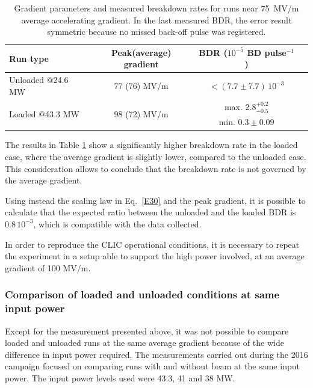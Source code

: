 \begin{table}[h]
  \centering
    \begin{tabular}{ l c c c }
    \hline
    \hline
    Run type							&		Peak(average) gradient  			& BDR ($10^{-5}$ BD pulse$^{-1}$)	\\
    \hline
    Unloaded	@24.6 MW 				&		77 (76) MV/m				&	$< (7.7 \pm 7.7) \, 10^{-3} $ 			\\
    \multirow{ 2}{*}{Loaded  @43.3 MW} 		&		\multirow{ 2}{*}{98 (72) MV/m} 	& 	max. $2.8^{+0.2} _{-0.5}$    		\\
    									&									&	min. $0.3\pm0.09$	\\
    \hline
    \hline
    \end{tabular}
\caption{Gradient parameters and measured breakdown rates for runs near 75~MV/m average accelerating gradient. In the last measured BDR, the error result symmetric because no missed back-off pulse was registered. }
\label{comp_avg75}
\end{table}

The results in Table \ref{comp_avg75} show a significantly higher breakdown rate in the loaded case, where the average gradient is slightly lower, compared to the unloaded case. This consideration allows to conclude that the breakdown rate is not governed by the average gradient.

Using instead the scaling law in Eq.~\ref{E30} and the peak gradient, it is possible to calculate that the expected ratio between the unloaded and the loaded BDR is $0.8\,10^{-3}$, which is compatible with the data collected. 

In order to reproduce the CLIC operational conditions, it is necessary to repeat the experiment in a setup able to support the high power involved, at an average gradient of 100 MV/m.



\subsubsection{Comparison of loaded and unloaded conditions at same input power}

Except for the measurement presented above, it was not possible to compare loaded and unloaded runs at the same average gradient because of the wide difference in input power required. The measurements carried out during the 2016 campaign focused on comparing runs with and without beam at the same input power.  The input power levels used were 43.3, 41 and 38 MW. 

